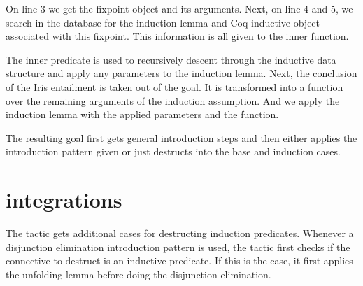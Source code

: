 \documentclass[thesis.tex]{subfiles}
\begin{document}
{On line 3 we get the fixpoint object and its arguments. Next, on line 4 and 5, we search in the database for the induction lemma and Coq inductive object associated with this fixpoint. This information is all given to the inner function.
%


The inner predicate is used to recursively descent through the inductive data structure and apply any parameters to the induction lemma. Next, the conclusion of the Iris entailment is taken out of the goal. It is transformed into a function over the remaining arguments of the induction assumption. And we apply the induction lemma with the applied parameters and the function.

The resulting goal first gets general introduction steps and then either applies the introduction pattern given or just destructs into the base and induction cases.

\section{ integrations}\label{sec:indintros}
The  tactic gets additional cases for destructing induction predicates. Whenever a disjunction elimination introduction pattern is used, the tactic first checks if the connective to destruct is an inductive predicate. If this is the case, it first applies the unfolding lemma before doing the disjunction elimination.

}
\end{document}
